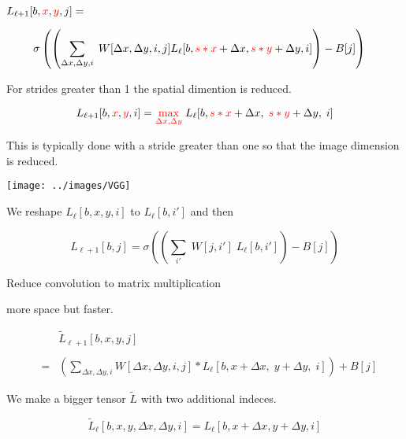 {\vfill
$L_{{\ell+1}}[b,{\color{red}x},{\color{red}y},j] =$

$$\hspace{-1em}\sigma\left(\left(\sum_{\Delta x,\Delta y,i}\;W[\Delta x, \Delta y, i, j] L_{{\ell}}[b,{\color{red} s*x} + \Delta x, {\color{red} s*y} + \Delta y, i]\right) - B[j]\right)$$

\vfill
For strides greater than 1 the spatial dimention is reduced.


$$L_{{\ell+1}}[b,{\color{red}x},{\color{red}y},i] = {\color{red} \max_{\Delta x, \Delta y}}\; L_{{\ell}}[b,{\color{red} s*x} + \Delta x,\; {\color{red} s*y} + \Delta y,\; i]$$

\vfill
This is typically done with a stride greater than one so that the image dimension is reduced.



\centerline{\texttt{[image: ../images/VGG]}}



We reshape $L_{{\ell}}[b,x,y,i]$ to $L_{{\ell}}[b,i']$ and then

\vfill
$$L_{{\ell+1}}[b,j] = \sigma\left(\left(\sum_{i'} \;W[j,i']\;L_{{\ell}}[b,i']\right) - B[j]\right)$$


Reduce convolution to matrix multiplication

\vfill
more space but faster.

\vfill
\begin{eqnarray*}
  & & \tilde{L}_{{\ell+1}}[b,x,y,j] \\
  \\
  & = & \left(\sum_{\Delta x, \Delta y, i} W[\Delta x, \Delta y, i, j] *L_{{\ell}}[b,x + \Delta x,\; y + \Delta y,\; i]\right) + B[j]
  \end{eqnarray*}

\vfill
We make a bigger tensor $\tilde{L}$ with two additional indeces.

$$\tilde{L}_{{\ell}}[b,x,y,\Delta x,\Delta y,i] = L_{{\ell}}[b,x+\Delta x,y+\Delta y,i]$$


}
